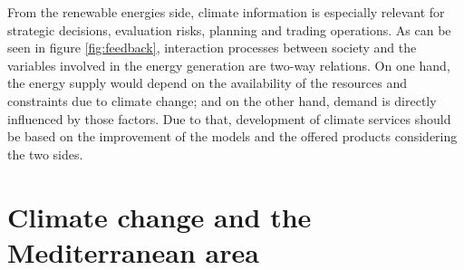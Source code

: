 From the renewable energies side, climate information is especially relevant for strategic decisions, evaluation risks, planning and trading operations. As can be seen in figure \ref{fig:feedback}, interaction processes between society and the variables involved in the energy generation are two-way relations. On one hand, the energy supply would depend on the availability of the resources and constraints due to climate change;  and on the other hand, demand is directly influenced by those factors. Due to that, development of climate services should be based on the improvement of the models and the offered products considering the two sides.   






\section{Climate change and the Mediterranean area}


